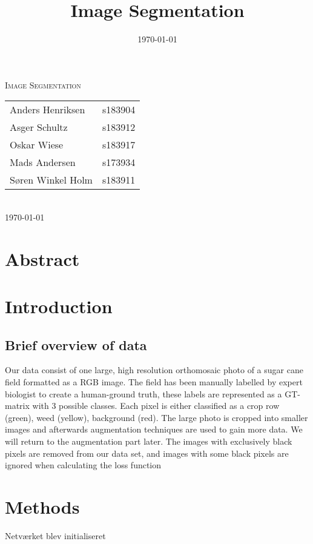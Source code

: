 \documentclass[12pt,fleqn]{article}
\title{Image Segmentation}
\author{}
\date{\today}
\begin{document}

\begin{titlepage}
	\begin{center}
		\textsc{\LARGE Image Segmentation}\\
		[1.0cm]
		{
		\large
		\begin{tabular}{lr}
			Anders Henriksen&s183904\\
			Asger Schultz&s183912\\
			Oskar Wiese&s183917\\
			Mads Andersen&s173934\\

			Søren Winkel Holm&s183911
		\end{tabular}
		}\\
		[0.5cm]
		\textsc{\large \today}
	\end{center}
\end{titlepage}
\tableofcontents \newpage

\section{Abstract}
\section{Introduction}
\subsection{Brief overview of data}
Our data consist of one large, high resolution orthomosaic photo of a sugar cane field formatted as a RGB image. The field has been manually labelled by expert biologist to create a human-ground truth, these labels are represented as a GT-matrix with 3 possible classes. Each pixel is either classified as a crop row (green), weed (yellow), background (red). The large photo is cropped into smaller images and afterwards augmentation techniques are used to gain more data. We will return to the augmentation part later. The images with exclusively black pixels are removed from our data set, and images with some black pixels are ignored when calculating the loss function 

\section{Methods}
Netværket blev initialiseret
\end{document}
